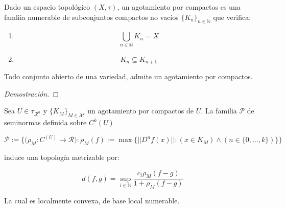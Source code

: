 \begin{defn}
	Dado un espacio topológico $(X,\tau)$, un agotamiento por compactos es una famliia numerable de subconjuntos compactos no vacíos $\{K_n\}_{n \in \mathbb{N}}$  que verifica:
	\begin{enumerate}
		\item \begin{equation*}
			\bigcup_{n \in \mathbb{N}} K_n = X
		\end{equation*}
		
		\item  \begin{equation*}
			K_n \subseteq K_{n+1}
		\end{equation*}
	\end{enumerate}
\end{defn}

\begin{thm}
	Todo conjunto abierto de una variedad, admite un agotamiento por compactos. 
\end{thm}

\begin{proof}[Demostración]
	
\end{proof}


\begin{prop}[Topología $C^k$]
	Sea $U \in \tau_{\mathcal{R}^n}$ y $\{K_M\}_{M \in \mathcal{M}}$ un agotamiento por compactos de $U$.
	La familia $\mathcal{P}$ de seminormas definida sobre $C^k(U)$ 
	
	\begin{equation*}
		\mathcal{P} := \{\bigg(\rho_{M} : C^(U)\to \mathcal{R} \bigg):  \rho_{M}(f) := \max \{ ||D^n f(x)||: (x \in K_M) \land ( n\in \{0,\dots,k\} )  \} \}
	\end{equation*}
	
	induce una topología metrizable por:
	
	\begin{equation*}
		d(f,g) = \sup_{i \in \mathbb{N}} \frac{c_i \rho_M(f-g)}{1+\rho_M(f-g)}
	\end{equation*}
	
	La cual es localmente convexa, de base local numerable.
\end{prop}


